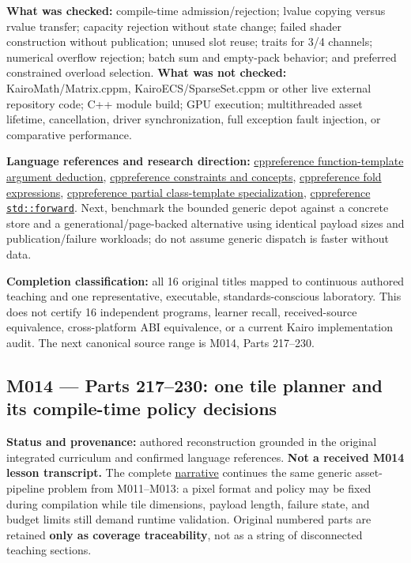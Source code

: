\textbf{What was checked:} compile-time admission/rejection; lvalue copying versus rvalue transfer; capacity rejection without state change; failed shader construction without publication; unused slot reuse; traits for 3/4 channels; numerical overflow rejection; batch sum and empty-pack behavior; and preferred constrained overload selection. \textbf{What was not checked:} KairoMath/Matrix.cppm, KairoECS/SparseSet.cppm or other live external repository code; C++ module build; GPU execution; multithreaded asset lifetime, cancellation, driver synchronization, full exception fault injection, or comparative performance.

\textbf{Language references and research direction:} \href{https://en.cppreference.com/w/cpp/language/template_argument_deduction}{cppreference function-template argument deduction}, \href{https://en.cppreference.com/w/cpp/language/constraints}{cppreference constraints and concepts}, \href{https://en.cppreference.com/w/cpp/language/fold}{cppreference fold expressions}, \href{https://en.cppreference.com/w/cpp/language/partial_specialization}{cppreference partial class-template specialization}, \href{https://en.cppreference.com/w/cpp/utility/forward}{cppreference \texttt{std::forward}}. Next, benchmark the bounded generic depot against a concrete store and a generational/page-backed alternative using identical payload sizes and publication/failure workloads; do not assume generic dispatch is faster without data.

\textbf{Completion classification:} all 16 original titles mapped to continuous authored teaching and one representative, executable, standards-conscious laboratory. This does not certify 16 independent programs, learner recall, received-source equivalence, cross-platform ABI equivalence, or a current Kairo implementation audit. The next canonical source range is M014, Parts 217--230.

\subsection{M014 --- Parts 217--230: one tile planner and its compile-time policy decisions}\label{appendix-fd090d982a15-m014-parts-217230-one-tile-planner-and-its-compile-time-policy-decisions}

\hypertarget{appendix-fd090d982a15-m014-parts-217230-one-tile-planner-and-its-compile-time-policy-decisions}{}

\textbf{Status and provenance:} authored reconstruction grounded in the original integrated curriculum and confirmed language references. \textbf{Not a received M014 lesson transcript.} The complete \hyperref[01-foundations-i-ch005-a-texture-tile-that-chooses-its-work-before-the-frame-begins]{narrative} continues the same generic asset-pipeline problem from M011--M013: a pixel format and policy may be fixed during compilation while tile dimensions, payload length, failure state, and budget limits still demand runtime validation. Original numbered parts are retained \textbf{only as coverage traceability}, not as a string of disconnected teaching sections.

